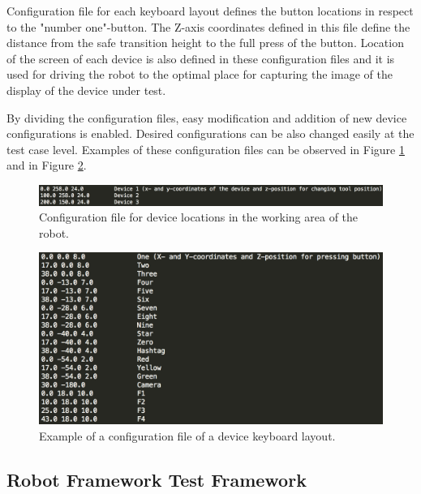 Configuration file for each keyboard layout defines the button locations in respect to the "number one"-button. The Z-axis coordinates defined in this file define the distance from the safe transition height to the full press of the button. Location of the screen of each device is also defined in these configuration files and it is used for driving the robot to the optimal place for capturing the image of the display of the device under test. 

By dividing the configuration files, easy modification and addition of new device configurations is enabled. Desired configurations can be also changed easily at the test case level. Examples of these configuration files can be observed in Figure \ref{fig:conf1} and in Figure \ref{fig:conf2}.

\begin{figure}[ht]
  \begin{center}
    \includegraphics[width=\textwidth]{images/conf1.png}
    \caption{Configuration file for device locations in the working area of the robot.}
    \label{fig:conf1}
  \end{center}
\end{figure}
\FloatBarrier

\begin{figure}[ht]
  \begin{center}
    \includegraphics[width=11	cm]{images/conf2.png}
    \caption{Example of a configuration file of a device keyboard layout.}
    \label{fig:conf2}
  \end{center}
\end{figure}
\FloatBarrier

\subsection{Robot Framework Test Framework}
\label{subsection:Robot Framework and libraries}

